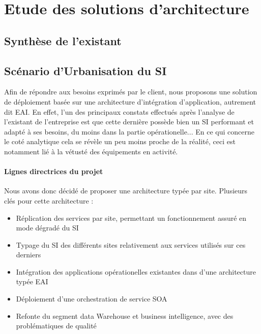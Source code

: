 \section{Etude des solutions d'architecture}

\subsection{Synthèse de l'existant}

\subsection{Scénario d'Urbanisation du SI}

Afin de répondre aux besoins exprimés par le client, nous proposons une solution de déploiement basée sur une architecture d'intégration d'application, autrement dit EAI. 
En effet, l'un des principaux constats effectués après l'analyse de l'existant de l'entreprise est que cette dernière possède bien un SI performant et adapté à ses besoins, du moins dans la partie opérationelle... En ce qui concerne le coté analytique cela se révèle un peu moins proche de la réalité, ceci est notamment lié à la vétusté des équipements en activité.

\paragraph{Lignes directrices du projet}

Nous avons donc décidé de proposer une architecture typée par site. Plusieurs clés pour cette architecture :\\

\begin{itemize}
\item Réplication des services par site, permettant un fonctionnement assuré en mode dégradé du SI
\item Typage du SI des différents sites relativement aux services utilisés sur ces derniers
\item Intégration des applications opérationelles existantes dans d'une architecture typée EAI
\item Déploiement d'une orchestration de service SOA
\item Refonte du segment data Warehouse et business intelligence, avec des problématiques de qualité\\
\end{itemize}

